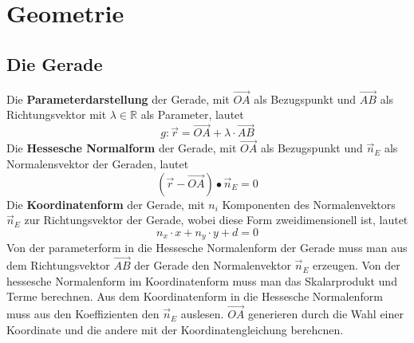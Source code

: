 \section{Geometrie}
\subsection{Die Gerade}
Die \textbf{Parameterdarstellung} der Gerade, mit $\overrightarrow{OA}$ als Bezugspunkt und $\overrightarrow{AB}$ als Richtungsvektor mit $\lambda\in \mathbb{R}$ als Parameter, lautet
\begin{equation}
\boxed{g:\overrightarrow{r}=\overrightarrow{OA}+\lambda\cdot \overrightarrow{AB}}
\end{equation}
Die \textbf{Hessesche Normalform} der Gerade, mit $\overrightarrow{OA}$ als Bezugspunkt und $\overrightarrow{n}_E$ als Normalensvektor der Geraden, lautet
\begin{equation}
\boxed{\left(\overrightarrow{r}-\overrightarrow{OA}\right)\bullet \overrightarrow{n}_E=0}
\end{equation}
Die \textbf{Koordinatenform} der Gerade, mit $n_i$ Komponenten des Normalenvektors $\overrightarrow{n}_E$ zur Richtungsvektor der Gerade, wobei diese Form zweidimensionell ist, lautet
\begin{equation}
\boxed{n_x\cdot x+n_y\cdot y+d=0}
\end{equation}
Von der parameterform in die Hessesche Normalenform der Gerade muss man aus dem Richtungsvektor $\overrightarrow{AB}$ der Gerade den Normalenvektor $\overrightarrow{n}_E$ erzeugen.\newline\newline
Von der hessesche Normalenform im Koordinatenform muss man das Skalarprodukt und Terme berechnen. 
\newline\newline
Aus dem Koordinatenform in die Hessesche Normalenform muss aus den Koeffizienten den $\overrightarrow{n}_E$ auslesen. $\overrightarrow{OA}$ generieren durch die Wahl einer Koordinate und die andere mit der Koordinatengleichung berehcnen. 
